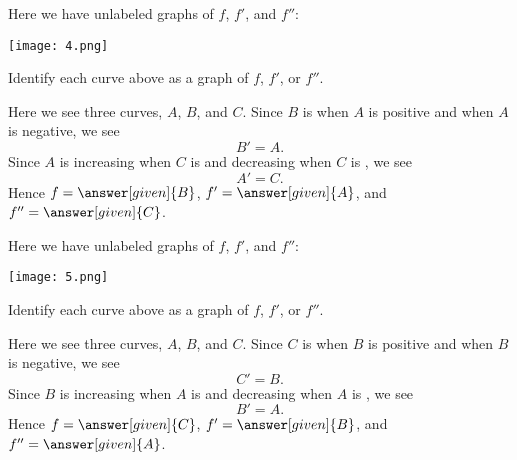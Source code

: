 \documentclass{ximera}
\begin{document}
\begin{example}
    Here we have unlabeled graphs of $f$, $f'$, and $f''$:
\begin{image}
      \texttt{[image: 4.png]}
\end{image}
    Identify each curve above as a graph of $f$, $f'$, or $f''$.
      \begin{explanation} 
        Here we see three curves, $A$, $B$, and $C$. Since $B$ is
         when $A$
        is positive and
         when $A$
        is negative, we see
        \[
        B'=A.
        \]
        Since $A$ is increasing when $C$ is
          and decreasing when $C$ is
          , we
          see
        \[
        A'=C.
        \]
        Hence $f=\answer[given]{B}$, $f'=\answer[given]{A}$, and
        $f''=\answer[given]{C}$.
      \end{explanation}
\end{example}

\begin{example}
  Here we have unlabeled graphs of $f$, $f'$, and $f''$:
  \begin{image}
    \texttt{[image: 5.png]}
  \end{image}
  Identify each curve above as a graph of $f$, $f'$, or $f''$.
    \begin{explanation} %
    Here we see three curves, $A$, $B$, and $C$. Since $C$ is
     when $B$ is
    positive and 
    when $B$ is negative, we see
    \[
    C'=B.
    \]
    Since $B$ is increasing when $A$ is
     and
    decreasing when $A$ is
    , we see
    \[
    B'=A.
    \]
    Hence $f=\answer[given]{C}$, $f'=\answer[given]{B}$, and
    $f''=\answer[given]{A}$.
  \end{explanation}
\end{example}
\end{document}
